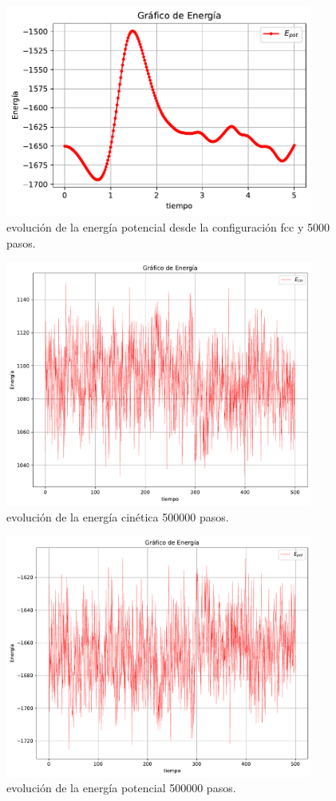 \documentclass[11pt]{article} %
\begin{document}
\begin{figure}[h!] \centering
	\includegraphics[width=0.9\textwidth]{../../Graficas/Epot-equilibra.pdf}
	\caption{evolución de la energía potencial desde la configuración fcc y 5000 pasos.}
	\label{Fig:03}
\end{figure}	

\begin{figure}[h!] \centering
	\includegraphics[width=0.9\textwidth]{../../Graficas/Ecin-equilibra-500K.pdf}
	\caption{evolución de la energía cinética 500000 pasos.}
	\label{Fig:05}
\end{figure}	

\begin{figure}[h!] \centering
	\includegraphics[width=0.9\textwidth]{../../Graficas/Epot-equilibra-500K.pdf}
	\caption{evolución de la energía potencial 500000 pasos.}
	\label{Fig:06}
\end{figure}	


	
\end{document}
